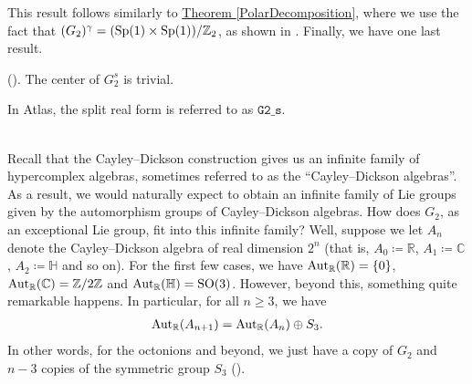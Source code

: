 \noindent This result follows similarly to \hyperref[PolarDecomposition]{Theorem \ref*{PolarDecomposition}}, where we use the fact that $(G_2)^\gamma = (\textup{Sp}(1) \times \textup{Sp}(1))/\mathbb{Z}_2$, as shown in \cite[Theorem 1.10.1]{Yok25}. Finally, we have one last result.\\

\noindent\begin{theorem}\textup{(\cite[Theorem 1.13.2]{Yok25}).} The center of $G_2^s$ is trivial.\\
\end{theorem}

\noindent In Atlas, the split real form is referred to as $\texttt{G2\_s}$.

\newpage
\renewcommand\thesection{A}
\noindent\\ Recall that the Cayley--Dickson construction gives us an infinite family of hypercomplex algebras, sometimes referred to as the ``Cayley--Dickson algebras''. As a result, we would naturally expect to obtain an infinite family of Lie groups given by the automorphism groups of Cayley--Dickson algebras. How does $G_2$, as an exceptional Lie group, fit into this infinite family? Well, suppose we let $A_n$ denote the Cayley--Dickson algebra of real dimension $2^n$ (that is, $A_0 \coloneqq \mathbb{R}$, $A_1 \coloneqq \mathbb{C}$, $A_2 \coloneqq \mathbb{H}$ and so on). For the first few cases, we have $\textup{Aut}_\mathbb{R}(\mathbb{R}) = \{0\}$, $\textup{Aut}_\mathbb{R}(\mathbb{C}) = \mathbb{Z}/2\mathbb{Z}$ and $\textup{Aut}_\mathbb{R}(\mathbb{H}) = \textup{SO}(3)$. However, beyond this, something quite remarkable happens. In particular, for all $n \geq 3$, we have
\begin{align*}
\begin{split}
\textup{Aut}_\mathbb{R}(A_{n+1}) = \textup{Aut}_\mathbb{R}(A_n) \oplus S_3.
\end{split}
\end{align*}
\noindent In other words, for the octonions and beyond, we just have a copy of $G_2$ and $n-3$ copies of the symmetric group $S_3$ (\cite{ES90}).

\newpage
\renewcommand\thesection{R}
\begingroup
\setlength{\emergencystretch}{.5em}
\printbibliography[heading=none]
\endgroup


